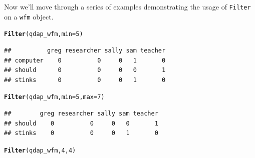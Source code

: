 \documentclass{article}\usepackage[]{graphicx}\usepackage[]{color}
\makeatletter
\newcommand{\hlnum}[1]{\textcolor[rgb]{0.686,0.059,0.569}{#1}}%
\newcommand{\hlstd}[1]{\textcolor[rgb]{0.345,0.345,0.345}{#1}}%
\newcommand{\hlkwc}[1]{\textcolor[rgb]{0.333,0.667,0.333}{#1}}%
\newcommand{\hlkwd}[1]{\textcolor[rgb]{0.737,0.353,0.396}{\textbf{#1}}}%
\newenvironment{kframe}{%
 \def\at@end@of@kframe{}%
 \ifinner\ifhmode%
  \def\at@end@of@kframe{\end{minipage}}%
  \begin{minipage}{\columnwidth}%
 \fi\fi%
 \def\FrameCommand##1{\hskip\@totalleftmargin \hskip-\fboxsep
 \colorbox{shadecolor}{##1}\hskip-\fboxsep
     \hskip-\linewidth \hskip-\@totalleftmargin \hskip\columnwidth}%
 \MakeFramed {\advance\hsize-\width
   \@totalleftmargin\z@ \linewidth\hsize
   \@setminipage}}%
 {\par\unskip\endMakeFramed%
 \at@end@of@kframe}
\newenvironment{knitrout}{}{} %
\makeatother
\begin{document}
Now we'll move through a series of examples demonstrating the usage of \texttt{Filter} on a \texttt{wfm} object.


\begin{knitrout}
\color{fgcolor}\begin{kframe}
\begin{alltt}
\hlkwd{Filter}\hlstd{(qdap_wfm,} \hlkwc{min} \hlstd{=} \hlnum{5}\hlstd{)}
\end{alltt}
\end{kframe}
\end{knitrout}



\begin{knitrout}
\color{fgcolor}\begin{kframe}
\begin{verbatim}
##          greg researcher sally sam teacher
## computer    0          0     0   1       0
## should      0          0     0   0       1
## stinks      0          0     0   1       0
\end{verbatim}
\end{kframe}
\end{knitrout}



\begin{knitrout}
\color{fgcolor}\begin{kframe}
\begin{alltt}
\hlkwd{Filter}\hlstd{(qdap_wfm,} \hlkwc{min} \hlstd{=} \hlnum{5}\hlstd{,} \hlkwc{max} \hlstd{=} \hlnum{7}\hlstd{)}
\end{alltt}
\end{kframe}
\end{knitrout}


\begin{knitrout}
\color{fgcolor}\begin{kframe}
\begin{verbatim}
##        greg researcher sally sam teacher
## should    0          0     0   0       1
## stinks    0          0     0   1       0
\end{verbatim}
\end{kframe}
\end{knitrout}


\begin{knitrout}
\color{fgcolor}\begin{kframe}
\begin{alltt}
\hlkwd{Filter}\hlstd{(qdap_wfm,} \hlnum{4}\hlstd{,} \hlnum{4}\hlstd{)}
\end{alltt}
\end{kframe}
\end{knitrout}
\end{document}
